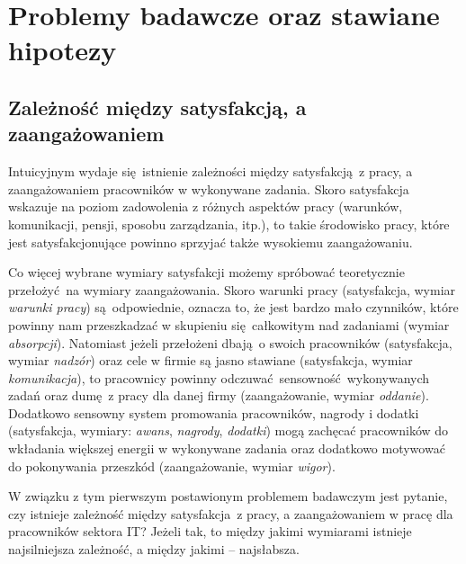 \section{Problemy badawcze oraz stawiane hipotezy}
\subsection{Zależność między satysfakcją, a zaangażowaniem}
\label{sec:hypothesis-relation}
Intuicyjnym wydaje się istnienie zależności między satysfakcją z pracy, a zaangażowaniem pracowników w wykonywane zadania. Skoro satysfakcja wskazuje na poziom zadowolenia z różnych aspektów pracy (warunków, komunikacji, pensji, sposobu zarządzania, itp.), to takie środowisko pracy, które jest satysfakcjonujące powinno sprzyjać także wysokiemu zaangażowaniu. 

Co więcej wybrane wymiary satysfakcji możemy spróbować teoretycznie przełożyć na wymiary zaangażowania. Skoro warunki pracy (satysfakcja, wymiar \textit{warunki pracy}) są odpowiednie, oznacza to, że jest bardzo mało czynników, które powinny nam przeszkadzać w skupieniu
się całkowitym nad zadaniami (wymiar \textit{absorpcji}). Natomiast jeżeli przełożeni dbają o swoich pracowników (satysfakcja, wymiar \textit{nadzór}) oraz cele w firmie są jasno stawiane (satysfakcja, wymiar \textit{komunikacja}), to pracownicy powinny odczuwać sensowność wykonywanych zadań oraz dumę z pracy dla danej firmy (zaangażowanie, wymiar \textit{oddanie}). Dodatkowo sensowny system promowania pracowników, nagrody i dodatki (satysfakcja, wymiary: \textit{awans},
\textit{nagrody}, \textit{dodatki}) mogą zachęcać pracowników do wkładania większej energii w wykonywane zadania oraz dodatkowo motywować do pokonywania przeszkód (zaangażowanie, wymiar \textit{wigor}).

W związku z tym pierwszym postawionym problemem badawczym jest pytanie, czy istnieje zależność między satysfakcja z pracy, a zaangażowaniem w pracę dla pracowników sektora IT? Jeżeli tak, to między jakimi wymiarami istnieje najsilniejsza zależność, a między jakimi -- najsłabsza.

